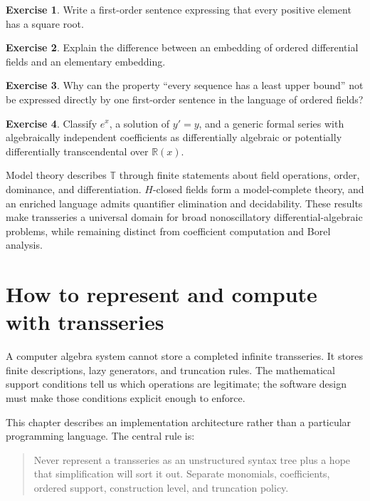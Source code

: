 \documentclass[11pt,openany]{book}
\theoremstyle{definition}
\newtheorem{exercise}{Exercise}[chapter]
\theoremstyle{plain}
\theoremstyle{remark}
\newcommand{\R}{\mathbb{R}}
\newcommand{\T}{\mathbb{T}}
\begin{document}
\begin{exercise}
Write a first-order sentence expressing that every positive element has a square root.
\end{exercise}

\begin{exercise}
Explain the difference between an embedding of ordered differential fields and an elementary embedding.
\end{exercise}

\begin{exercise}
Why can the property ``every sequence has a least upper bound'' not be expressed directly by one first-order sentence in the language of ordered fields?
\end{exercise}

\begin{exercise}
Classify $e^x$, a solution of $y'=y$, and a generic formal series with algebraically independent coefficients as differentially algebraic or potentially differentially transcendental over $\R(x)$.
\end{exercise}

\begin{summarybox}
Model theory describes $\T$ through finite statements about field operations, order, dominance, and differentiation. $H$-closed fields form a model-complete theory, and an enriched language admits quantifier elimination and decidability. These results make transseries a universal domain for broad nonoscillatory differential-algebraic problems, while remaining distinct from coefficient computation and Borel analysis.
\end{summarybox}

\chapter{How to represent and compute with transseries}\label{ch:computation}

A computer algebra system cannot store a completed infinite transseries. It stores finite descriptions, lazy generators, and truncation rules. The mathematical support conditions tell us which operations are legitimate; the software design must make those conditions explicit enough to enforce.

This chapter describes an implementation architecture rather than a particular programming language. The central rule is:

\begin{quote}
Never represent a transseries as an unstructured syntax tree plus a hope that simplification will sort it out. Separate monomials, coefficients, ordered support, construction level, and truncation policy.
\end{quote}
\end{document}
